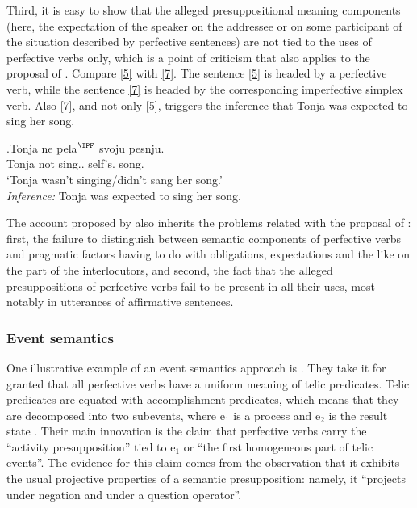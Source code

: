  Third, it is easy to show that the alleged presuppositional meaning components (here, the expectation of the speaker on the addressee or on some participant of the situation described by perfective sentences) are not tied to the uses of perfective verbs only, which is a point of criticism that also applies to the proposal of \citet{Paducheva:96}. Compare \ref{5} with \ref{7}. The sentence \ref{5} is headed by a perfective verb, while the sentence \ref{7} is headed by the corresponding imperfective simplex verb. Also \ref{7}, and not only \ref{5}, triggers the inference that Tonja was expected to sing her song.

\exg.\label{7}Tonja ne pela$^{\IPF}$ svoju pesnju.\\
 Tonja not sing.. self's. song.\\
 \trans `Tonja wasn't singing/didn't sang her song.'\\
\textit{Inference:} Tonja was expected to sing her song.

The account proposed by \citet{Romanova:06} also inherits the problems related with the proposal of \citet{Paducheva:96}: first, the failure to distinguish between semantic components of perfective verbs and pragmatic factors having to do with obligations, expectations and the like on the part of the interlocutors, and second, the fact that the alleged presuppositions of perfective verbs fail to be present in all their uses, most notably in utterances of affirmative sentences. 

\subsubsection{Event semantics}
One illustrative example of an event semantics approach is \citet{Docekal:09}. They take it for granted that all perfective verbs have a uniform meaning of telic predicates. Telic predicates are equated with accomplishment predicates, which means that they are decomposed into two subevents, where e$_1$ is a process and e$_2$ is the result state \citep[mainly following][]{Giorgi:01}. Their main innovation is the claim that perfective verbs carry the ``activity presupposition'' tied to e$_1$ or ``the first homogeneous part of telic events''. The evidence for this claim comes from the observation that it exhibits the usual projective properties of a semantic presupposition: namely, it ``projects under negation and under a question operator''.

